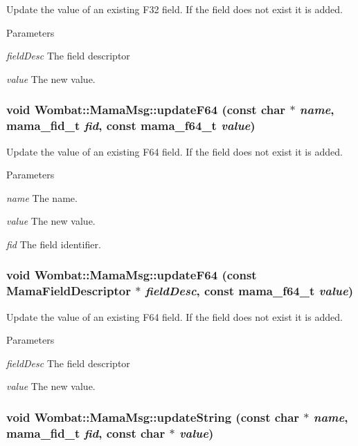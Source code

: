 Update the value of an existing F32 field. If the field does not exist it is added.


\begin{DoxyParams}{Parameters}
\item[{\em fieldDesc}]The field descriptor \item[{\em value}]The new value. \end{DoxyParams}
\hypertarget{classWombat_1_1MamaMsg_a31785ea2684eb01d023dae470f05c4b1}{
\subsubsection[{updateF64}]{\setlength{\rightskip}{0pt plus 5cm}void Wombat::MamaMsg::updateF64 (const char $\ast$ {\em name}, \/  mama\_\-fid\_\-t {\em fid}, \/  const mama\_\-f64\_\-t {\em value})}}
\label{classWombat_1_1MamaMsg_a31785ea2684eb01d023dae470f05c4b1}


Update the value of an existing F64 field. If the field does not exist it is added.


\begin{DoxyParams}{Parameters}
\item[{\em name}]The name. \item[{\em value}]The new value. \item[{\em fid}]The field identifier. \end{DoxyParams}
\hypertarget{classWombat_1_1MamaMsg_a314548c34f5d946a8a8a607daf1c7889}{
\subsubsection[{updateF64}]{\setlength{\rightskip}{0pt plus 5cm}void Wombat::MamaMsg::updateF64 (const {\bf MamaFieldDescriptor} $\ast$ {\em fieldDesc}, \/  const mama\_\-f64\_\-t {\em value})}}
\label{classWombat_1_1MamaMsg_a314548c34f5d946a8a8a607daf1c7889}


Update the value of an existing F64 field. If the field does not exist it is added.


\begin{DoxyParams}{Parameters}
\item[{\em fieldDesc}]The field descriptor \item[{\em value}]The new value. \end{DoxyParams}
\hypertarget{classWombat_1_1MamaMsg_a16d653a54913e43bb11cbfcea247b867}{
\subsubsection[{updateString}]{\setlength{\rightskip}{0pt plus 5cm}void Wombat::MamaMsg::updateString (const char $\ast$ {\em name}, \/  mama\_\-fid\_\-t {\em fid}, \/  const char $\ast$ {\em value})}}
\label{classWombat_1_1MamaMsg_a16d653a54913e43bb11cbfcea247b867}


